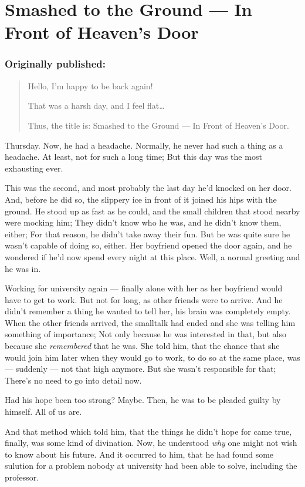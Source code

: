 \chapter{Smashed to the Ground --- In Front of Heaven's Door}
\label{cha:smashed-ground-front-door}
\subsection*{Originally published: }
\begin{quote}
Hello, I'm happy to be back again!

That was a harsh day, and I feel flat\dots{}

Thus, the title is: Smashed to the Ground --- In Front of Heaven's Door.
\end{quote}

Thursday. 
Now, he had a headache. 
Normally, he never had such a thing as a headache. 
At least, not for such a long time; But this day was the most exhausting ever.

This was the second, and most probably the last day he'd knocked on her door. 
And, before he did so, the slippery ice in front of it joined his hips with the ground. 
He stood up as fast as he could, and the small children that stood nearby were mocking him; They didn't know who he was, and he didn't know them, either; For that reason, he didn't take away their fun. 
But he was quite sure he wasn't capable of doing so, either. 
Her boyfriend opened the door again, and he wondered if he'd now spend every night at this place. 
Well, a normal greeting and he was in.

Working for university again --- finally alone with her as her boyfriend would have to get to work. 
But not for long, as other friends were to arrive. And he didn't remember a thing he wanted to tell her, his brain was completely empty. 
When the other friends arrived, the smalltalk had ended and she was telling him something of importance; Not only because he was interested in that, but also because she \emph{remembered} that he was. 
She told him, that the chance that she would join him later when they would go to work, to do so at the same place, was --- suddenly --- not that high anymore. 
But she wasn't responsible for that; There's no need to go into detail now.

Had his hope been too strong?
Maybe. 
Then, he was to be pleaded guilty by himself. 
All of us are.

And that method which told him, that the things he didn't hope for came true, finally, was some kind of divination. 
Now, he understood \emph{why} one might not wish to know about his future. 
And it occurred to him, that he had found some sulution for a problem nobody at university had been able to solve, including the professor.

